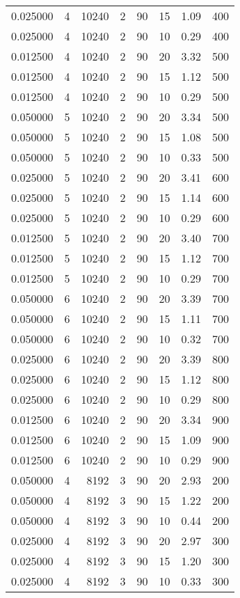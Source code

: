 \documentclass[12pt,letterpaper]{article}
\begin{document}
\begin{center}
\begin{longtable}{r|r|r|r|r|r|r|r}
0.025000 & 4 & 10240 & 2 & 90 & 15 & 1.09 & 400 \\
0.025000 & 4 & 10240 & 2 & 90 & 10 & 0.29 & 400 \\
0.012500 & 4 & 10240 & 2 & 90 & 20 & 3.32 & 500 \\
0.012500 & 4 & 10240 & 2 & 90 & 15 & 1.12 & 500 \\
0.012500 & 4 & 10240 & 2 & 90 & 10 & 0.29 & 500 \\
0.050000 & 5 & 10240 & 2 & 90 & 20 & 3.34 & 500 \\
0.050000 & 5 & 10240 & 2 & 90 & 15 & 1.08 & 500 \\
0.050000 & 5 & 10240 & 2 & 90 & 10 & 0.33 & 500 \\
0.025000 & 5 & 10240 & 2 & 90 & 20 & 3.41 & 600 \\
0.025000 & 5 & 10240 & 2 & 90 & 15 & 1.14 & 600 \\
0.025000 & 5 & 10240 & 2 & 90 & 10 & 0.29 & 600 \\
0.012500 & 5 & 10240 & 2 & 90 & 20 & 3.40 & 700 \\
0.012500 & 5 & 10240 & 2 & 90 & 15 & 1.12 & 700 \\
0.012500 & 5 & 10240 & 2 & 90 & 10 & 0.29 & 700 \\
0.050000 & 6 & 10240 & 2 & 90 & 20 & 3.39 & 700 \\
0.050000 & 6 & 10240 & 2 & 90 & 15 & 1.11 & 700 \\
0.050000 & 6 & 10240 & 2 & 90 & 10 & 0.32 & 700 \\
0.025000 & 6 & 10240 & 2 & 90 & 20 & 3.39 & 800 \\
0.025000 & 6 & 10240 & 2 & 90 & 15 & 1.12 & 800 \\
0.025000 & 6 & 10240 & 2 & 90 & 10 & 0.29 & 800 \\
0.012500 & 6 & 10240 & 2 & 90 & 20 & 3.34 & 900 \\
0.012500 & 6 & 10240 & 2 & 90 & 15 & 1.09 & 900 \\
0.012500 & 6 & 10240 & 2 & 90 & 10 & 0.29 & 900 \\
0.050000 & 4 & 8192 & 3 & 90 & 20 & 2.93 & 200 \\
0.050000 & 4 & 8192 & 3 & 90 & 15 & 1.22 & 200 \\
0.050000 & 4 & 8192 & 3 & 90 & 10 & 0.44 & 200 \\
0.025000 & 4 & 8192 & 3 & 90 & 20 & 2.97 & 300 \\
0.025000 & 4 & 8192 & 3 & 90 & 15 & 1.20 & 300 \\
0.025000 & 4 & 8192 & 3 & 90 & 10 & 0.33 & 300 \\

\end{longtable}
\end{center}
\end{document}
